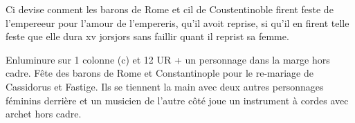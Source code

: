 \documentclass{article}
\begin{document}
\begin{pages}
         
            Ci devise conment 
               les barons de Rome 
               et cil de Coustentinoble firent 
               feste de l’empereeur pour l’amour de 
               l’empereris, qu’il avoit reprise, 
                  si qu’il en firent telle feste que elle dura xv 
                  jorsjors sans faillir
                  quant il reprist sa femme.
            
               Enluminure sur 1 colonne (c) et 12 UR + un personnage dans la marge hors cadre. 
                  Fête des barons de Rome et 
                  Constantinople 
                  pour le re-mariage de Cassidorus 
                  et Fastige. 
                  Ils se tiennent la main avec 
                  deux autres personnages féminins derrière et 
                  un musicien de l’autre côté joue un instrument à cordes avec archet hors cadre.
               

\end{pages}
\end{document}
